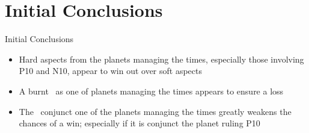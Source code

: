 \section{Initial Conclusions}
\begin{frame}[t]{Initial Conclusions}
\centering
\begin{minipage}{0.9\textwidth}
\begin{itemize}
\item Hard aspects from the planets managing the times, especially those involving P10 and N10, appear to win out over soft aspects
\item A burnt \Mercury\, as one of planets managing the times appears to ensure a loss
\item The \SouthNode\, conjunct one of the planets managing the times greatly weakens the chances of a win; especially if it is conjunct the planet ruling P10
\end{itemize}
\end{minipage}
\end{frame}